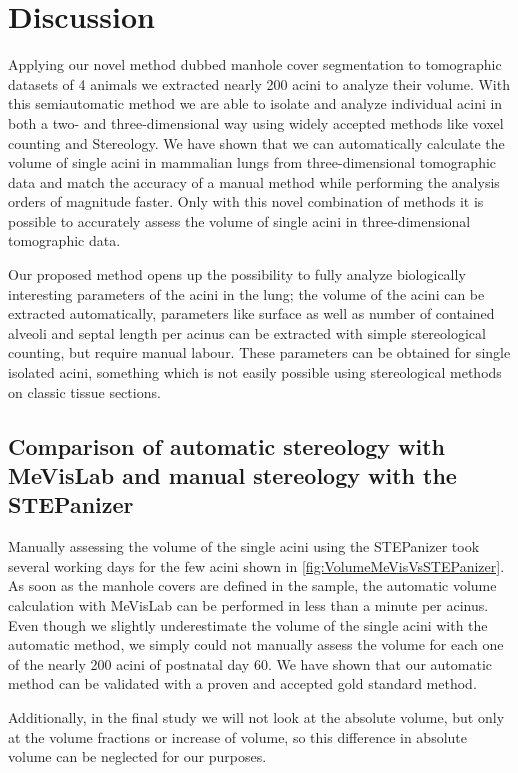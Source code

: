 \documentclass[%
	draft,
	paper=a4,%
	abstract=true,%
	]{scrartcl}
\begin{document}
\section{Discussion}
Applying our novel method dubbed manhole cover segmentation to tomographic datasets of 4 animals we extracted nearly 200 acini to analyze their volume. With this semiautomatic method we are able to isolate and analyze individual acini in both a two- and three-dimensional way using widely accepted methods like voxel counting and Stereology. We have shown that we can automatically calculate the volume of single acini in mammalian lungs from three-dimensional tomographic data and match the accuracy of a manual method while performing the analysis orders of magnitude faster. Only with this novel combination of methods it is possible to accurately assess the volume of single acini in three-dimensional tomographic data.

Our proposed method opens up the possibility to fully analyze biologically interesting parameters of the acini in the lung; the volume of the acini can be extracted automatically, parameters like surface as well as number of contained alveoli and septal length per acinus can be extracted with simple stereological counting, but require manual labour. These parameters can be obtained for single isolated acini, something which is not easily possible using stereological methods on classic tissue sections.

\subsection[Comparison of MeVisLab with STEPanizer]{Comparison of automatic stereology with MeVisLab and manual stereology with the STEPanizer}
Manually assessing the volume of the single acini using the STEPanizer took several working days for the few acini shown in \autoref{fig:VolumeMeVisVsSTEPanizer}. As soon as the manhole covers are defined in the sample, the automatic volume calculation with MeVisLab can be performed in less than a minute per acinus. Even though we slightly underestimate the volume of the single acini with the automatic method, we simply could not manually assess the volume for each one of the nearly 200 acini of postnatal day 60. We have shown that our automatic method can be validated with a proven and accepted gold standard method.

Additionally, in the final study we will not look at the absolute volume, but only at the volume fractions or increase of volume, so this difference in absolute volume can be neglected for our purposes.
\end{document}
